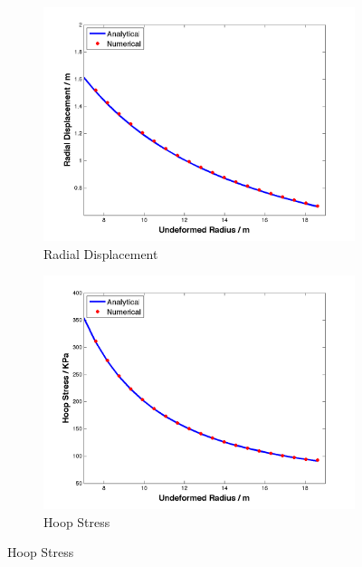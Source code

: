 \begin{figure}[t!p]
	\begin{subfigure}[b]{0.5\textwidth}
		\centering
		\includegraphics[width=\textwidth]{./figures/ur_200.png}
		\caption{Radial Displacement}
		\label{ur_200}
	\end{subfigure}
	\begin{subfigure}[b]{0.5\textwidth}
		\centering
		\includegraphics[width=\textwidth]{./figures/hoop_stress_200.png}
		\caption{Hoop Stress}
		\label{hoop_200}
	\end{subfigure}
	

\end{figure}
